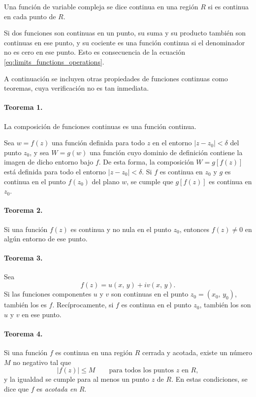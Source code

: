 \documentclass[a4paper]{report}
\begin{document}
Una función de variable compleja se dice continua en una región \(R\) si es continua en cada punto de \(R\).

Si dos funciones son continuas en un punto, su suma y su producto también son continuas en ese punto, y su cociente es una función continua si el denominador no es cero en ese punto. Esto es consecuencia de la ecuación \ref{eq:limits_functions_operations}.

A continuación se incluyen otras propiedades de funciones continuas como teoremas, cuya verificación no es tan inmediata.

\paragraph{Teorema 1.} La composición de funciones continuas es una función continua. 

Sea \(w=f(z)\) una función definida para todo \(z\) en el entorno \(|z-z_0|<\delta\) del punto \(z_0\), y sea \(W=g(w)\) una función cuyo dominio de definición contiene la imagen de dicho entorno bajo \(f\). De esta forma, la composición \(W=g[f(z)]\) está definida para todo el entorno \(|z-z_0|<\delta\). Si \(f\) es continua en \(z_0\) y \(g\) es continua en el punto \(f(z_0)\) del plano \(w\), se cumple que \(g[f(z)]\) es continua en \(z_0\).

\paragraph{Teorema 2.} Si una función \(f(z)\) es continua y no nula en el punto \(z_0\), entonces \(f(z)\neq0\) en algún entorno de ese punto.

\paragraph{Teorema 3.} Sea
\[
 f(z)=u(x,\,y)+iv(x,\,y).
\]
Si las funciones componentes \(u\) y \(v\) son continuas en el punto \(z_0=(x_0,\,y_0)\), también los es \(f\). Recíprocamente, si \(f\) es continua en el punto \(z_0\), también los son \(u\) y \(v\) en ese punto.

\paragraph{Teorema 4.} Si una función \(f\) es continua en una región \(R\) cerrada y acotada, existe un número \(M\) no negativo tal que 
\[
 |f(z)|\leq M\qquad\textrm{para todos los puntos }z\textrm{ en }R,
\]
y la igualdad se cumple para al menos un punto \(z\) de \(R\). En estas condiciones, se dice que \(f\) es \emph{acotada en }\(R\).
\end{document}

